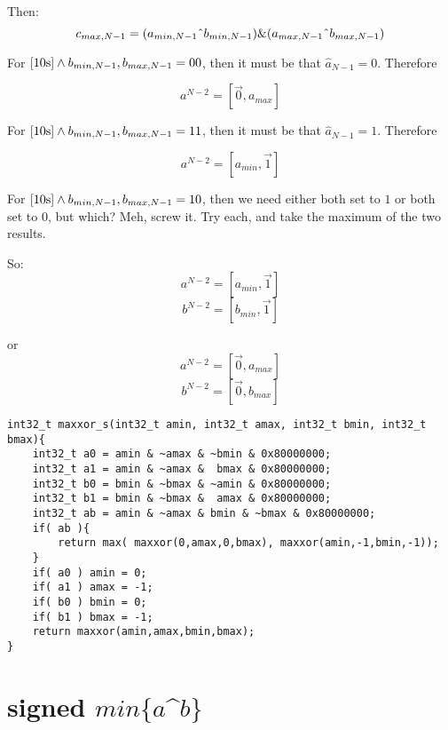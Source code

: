 \documentclass{article}
\begin{document}
Then:
\begin{equation*}
c_{max,N-1} = (a_{min,N-1}\text{\^{}}b_{min,N-1})\&(a_{max,N-1}\text{\^{}}b_{max,N-1})
\end{equation*}

For $\eqref{10s} \wedge b_{min,N-1},b_{max,N-1} = 00$, then it must be that 
$\hat a_{N-1} = 0$. Therefore

\begin{equation*}
a^{N-2} = [\vec 0, a_{max}]
\end{equation*}

For $\eqref{10s} \wedge b_{min,N-1},b_{max,N-1} = 11$, then it must be that
$\hat a_{N-1} = 1$. Therefore

\begin{equation*}
a^{N-2} = [a_{min},\vec 1]
\end{equation*}

For $\eqref{10s}\wedge b_{min,N-1},b_{max,N-1} = 10$, then we need either
both set to $1$ or both set to $0$, but which? Meh, screw it. Try each,
and take the maximum of the two results.

So:
\begin{equation*}
a^{N-2} = [a_{min},\vec 1]
\end{equation*}
\begin{equation*}
b^{N-2} = [b_{min},\vec 1]
\end{equation*}

or
\begin{equation*}
a^{N-2} = [\vec 0,a_{max}]
\end{equation*}
\begin{equation*}
b^{N-2} = [\vec 0,b_{max}]
\end{equation*}

\begin{lstlisting}
int32_t maxxor_s(int32_t amin, int32_t amax, int32_t bmin, int32_t bmax){
    int32_t a0 = amin & ~amax & ~bmin & 0x80000000;
    int32_t a1 = amin & ~amax &  bmax & 0x80000000;
    int32_t b0 = bmin & ~bmax & ~amin & 0x80000000;
    int32_t b1 = bmin & ~bmax &  amax & 0x80000000;
    int32_t ab = amin & ~amax & bmin & ~bmax & 0x80000000;
    if( ab ){
        return max( maxxor(0,amax,0,bmax), maxxor(amin,-1,bmin,-1));
    }
    if( a0 ) amin = 0;
    if( a1 ) amax = -1;
    if( b0 ) bmin = 0;
    if( b1 ) bmax = -1;
    return maxxor(amin,amax,bmin,bmax);
}
\end{lstlisting}

\section{signed $min\{a$\^{}$b\}$}
\end{document}
